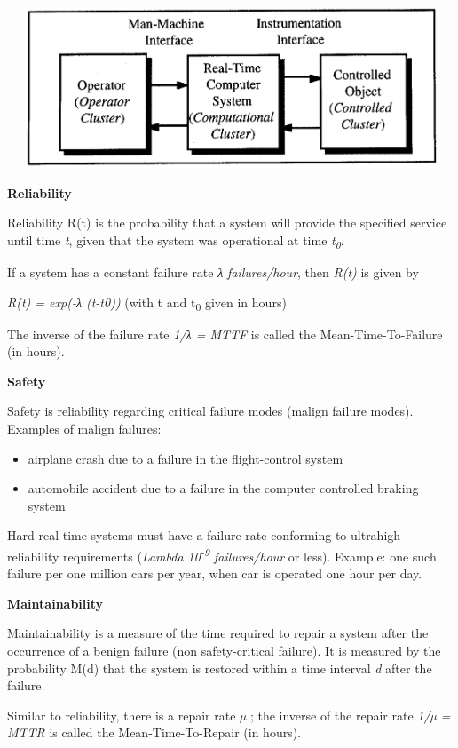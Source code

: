 \includegraphics[width=7.77292in,height=1.88542in]{media/Fig_1_1.png}

\textbf{Reliability}

Reliability R(t) is the probability that a system will provide the
specified service until time \emph{t}, given that the system was
operational at time \emph{t\textsubscript{0}}.

If a system has a constant failure rate \emph{λ} \emph{failures/hour},
then \emph{R(t)} is given by

\emph{R(t) = exp(-λ (t-t0))} (with t and t\textsubscript{0} given in
hours)

The inverse of the failure rate \emph{1/λ = MTTF} is called the
Mean-Time-To-Failure (in hours).

\textbf{Safety}

Safety is reliability regarding critical failure modes (malign failure
modes). Examples of malign failures:

\begin{itemize}
\item
  airplane crash due to a failure in the flight-control system
\item
  automobile accident due to a failure in the computer controlled
  braking system
\end{itemize}

Hard real-time systems must have a failure rate conforming to ultrahigh
reliability requirements (\emph{Lambda 10\textsuperscript{-9}
failures/hour} or less). Example: one such failure per one million cars
per year, when car is operated one hour per day.

\textbf{Maintainability}

Maintainability is a measure of the time required to repair a system
after the occurrence of a benign failure (non safety-critical failure).
It is measured by the probability M(d) that the system is restored
within a time interval \emph{d} after the failure.

Similar to reliability, there is a repair rate \emph{µ} ; the inverse of
the repair rate \emph{1/µ = MTTR} is called the Mean-Time-To-Repair (in
hours).

